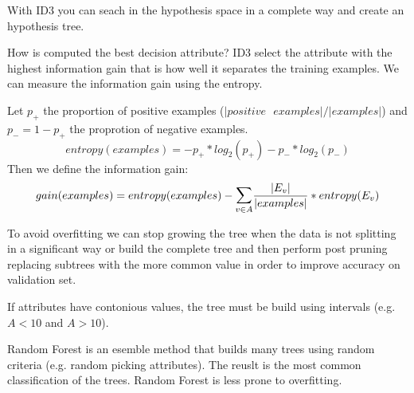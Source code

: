 With ID3 you can seach in the hypothesis space in a complete way and create an hypothesis tree.

How is computed the best decision attribute? ID3 select the attribute with the highest information gain that is how well it separates the training examples. We can measure the information gain using the entropy.

Let $p_+$ the proportion of positive examples ($|positive\text{ }examples|/|examples|$) and $p_- = 1 - p_+$ the proprotion of negative examples. 
\[
entropy(examples) = - p_+ * log_2(p_+) - p_- * log_2(p_-)
\]
Then we define the information gain:
\[
gain(examples) = entropy(examples) - \mathlarger{\sum}_{v \in A}\frac{|E_v|}{|examples|}*entropy(E_v)
\]

To avoid overfitting we can stop growing the tree when the data is not splitting in a significant way or build the complete tree and then perform post pruning replacing subtrees with the more common value in order to improve accuracy on validation set.

If attributes have contonious values, the tree must be build using intervals (e.g. $A < 10$ and $A > 10$).

Random Forest is an esemble method that builds many trees using random criteria (e.g. random picking attributes). The reuslt is the most common classification of the trees. Random Forest is less prone to overfitting.


